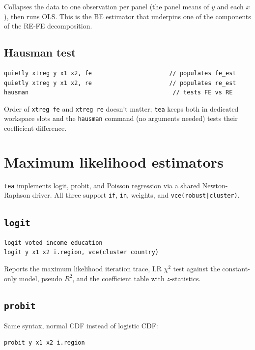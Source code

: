 \documentclass[11pt,letterpaper]{article}
\begin{document}
Collapses the data to one observation per panel (the panel means of
$y$ and each $x$), then runs OLS.  This is the BE estimator that
underpins one of the components of the RE-FE decomposition.

\subsection{Hausman test}

\begin{lstlisting}
quietly xtreg y x1 x2, fe                      // populates fe_est
quietly xtreg y x1 x2, re                      // populates re_est
hausman                                         // tests FE vs RE
\end{lstlisting}

Order of \texttt{xtreg fe} and \texttt{xtreg re} doesn't matter;
\texttt{tea} keeps both in dedicated workspace slots and the
\texttt{hausman} command (no arguments needed) tests their
coefficient difference.

\section{Maximum likelihood estimators}

\texttt{tea} implements logit, probit, and Poisson regression via a
shared Newton-Raphson driver.  All three support \texttt{if}, \texttt{in},
weights, and \texttt{vce(robust|cluster)}.

\subsection{\texttt{logit}}

\begin{lstlisting}
logit voted income education
logit y x1 x2 i.region, vce(cluster country)
\end{lstlisting}

Reports the maximum likelihood iteration trace, LR $\chi^2$ test
against the constant-only model, pseudo $R^2$, and the coefficient
table with $z$-statistics.

\subsection{\texttt{probit}}

Same syntax, normal CDF instead of logistic CDF:

\begin{lstlisting}
probit y x1 x2 i.region
\end{lstlisting}
\end{document}
